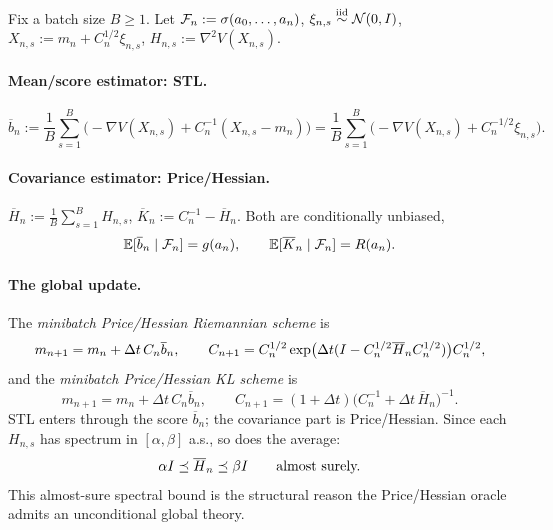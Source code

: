 Fix a batch size $B\geq1$. Let $\mathcal{F}_n:=\sigma(a_0,\ldots,a_n)$, $\xi_{n,s}\overset{\text{iid}}{\sim}\mathcal{N}(0,I)$,
$X_{n,s}:=m_n+C_n^{1/2}\xi_{n,s}$, $H_{n,s}:=\nabla^2V(X_{n,s})$.

\paragraph{Mean/score estimator: STL.}
\begin{equation}
\label{eq:STL-score}
    \overline b_n:=\frac1B\sum_{s=1}^B\bigl(-\nabla V(X_{n,s})+C_n^{-1}(X_{n,s}-m_n)\bigr)
    =\frac1B\sum_{s=1}^B\bigl(-\nabla V(X_{n,s})+C_n^{-1/2}\xi_{n,s}\bigr).
\end{equation}

\paragraph{Covariance estimator: Price/Hessian.}
$\overline H_n:=\tfrac1B\sum_{s=1}^BH_{n,s}$, $\overline K_n:=C_n^{-1}-\overline H_n$. Both are
conditionally unbiased,
\begin{equation}
\label{eq:STL-unbiased}
    \mathbb{E}[\overline b_n\mid\mathcal{F}_n]=g(a_n),
    \qquad
    \mathbb{E}[\overline K_n\mid\mathcal{F}_n]=R(a_n).
\end{equation}

\paragraph{The global update.}
The \emph{minibatch Price/Hessian Riemannian scheme} is
\begin{equation}
\label{eq:Riem-STL}
    m_{n+1}=m_n+\Delta t\,C_n\overline b_n,
    \qquad
    C_{n+1}=C_n^{1/2}\exp\bigl(\Delta t(I-C_n^{1/2}\overline H_nC_n^{1/2})\bigr)C_n^{1/2},
\end{equation}
and the \emph{minibatch Price/Hessian KL scheme} is
\begin{equation}
\label{eq:KL-STL}
    m_{n+1}=m_n+\Delta t\,C_n\overline b_n,
    \qquad
    C_{n+1}=(1+\Delta t)\bigl(C_n^{-1}+\Delta t\,\overline H_n\bigr)^{-1}.
\end{equation}
STL enters through the score $\overline b_n$; the covariance part is Price/Hessian. Since each
$H_{n,s}$ has spectrum in $[\alpha,\beta]$ a.s., so does the average:
\begin{equation}
\label{eq:pathwise-Hess}
    \alpha I\preceq\overline H_n\preceq\beta I\qquad\text{almost surely.}
\end{equation}
This almost-sure spectral bound is the structural reason the Price/Hessian oracle admits an
unconditional global theory.

